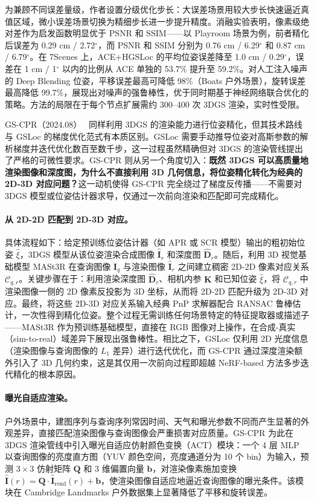 为兼顾不同误差量级，作者设置分级优化步长：大误差场景用较大步长快速逼近真值区域，微小误差场景切换为精细步长进一步提升精度。消融实验表明，像素级绝对差作为启发函数明显优于 PSNR 和 SSIM——以 Playroom 场景为例，前者精化后误差为 0.29 cm / 2.72$^\circ$，而 PSNR 和 SSIM 分别为 0.76 cm / 6.29$^\circ$ 和 0.87 cm / 6.79$^\circ$。在 7Scenes 上，ACE+HGSLoc 的平均位姿误差降至 1.0 cm / 0.29$^\circ$，误差在 1 cm / 1$^\circ$ 以内的比例从 ACE 单独的 53.7\% 提升至 59.2\%。对人工注入噪声的 Deep Blending 位姿，平移误差最高可降低 98\%（Boats 户外场景），旋转误差最高降低 99.7\%，展现出对噪声的强鲁棒性，优于同时期基于神经网络联合优化的策略。方法的局限在于每个节点扩展需约 300--400 次 3DGS 渲染，实时性受限。

GS-CPR（2024.08）~\cite{2408_11085} 同样利用 3DGS 的渲染能力进行位姿精化，但其技术路线与 GSLoc 的梯度优化范式有本质区别。GSLoc 需要手动推导位姿对高斯参数的解析梯度并迭代优化数百至数千步，这一过程虽然精确但对 3DGS 的渲染管线提出了严格的可微性要求。GS-CPR 则从另一个角度切入：\textbf{既然 3DGS 可以高质量地渲染图像和深度图，为什么不直接利用 3D 几何信息，将位姿精化转化为经典的 2D-3D 对应问题？}这一动机使得 GS-CPR 完全绕过了梯度反传播——不需要对 3DGS 模型或位姿估计器求导，仅通过一次前向渲染和匹配即可完成精化。

\paragraph{从 2D-2D 匹配到 2D-3D 对应。}
具体流程如下：给定预训练位姿估计器（如 APR 或 SCR 模型）输出的粗初始位姿 $\hat{\xi}$，3DGS 模型从该位姿渲染合成图像 $\hat{\mathbf{I}}_r$ 和深度图 $\hat{\mathbf{D}}_r$。随后，利用 3D 视觉基础模型 MASt3R 在查询图像 $\mathbf{I}_q$ 与渲染图像 $\hat{\mathbf{I}}_r$ 之间建立稠密 2D-2D 像素对应关系 $\mathcal{C}_{q,r}$。关键步骤在于：利用渲染深度图 $\hat{\mathbf{D}}_r$、相机内参 $\mathbf{K}$ 和已知位姿 $\hat{\xi}$，将 $\mathcal{C}_{q,r}$ 中渲染图像一侧的 2D 像素反投影为 3D 坐标，从而将 2D-2D 匹配升级为 2D-3D 对应。最终，将这些 2D-3D 对应关系输入经典 PnP 求解器配合 RANSAC 鲁棒估计，一次性得到精化位姿。整个过程无需训练任何场景特定的特征提取器或描述子——MASt3R 作为预训练基础模型，直接在 RGB 图像对上操作，在合成-真实（sim-to-real）域差异下展现出强鲁棒性。相比之下，GSLoc 仅利用 2D 光度信息（渲染图像与查询图像的 $L_1$ 差异）进行迭代优化，而 GS-CPR 通过深度渲染额外引入了 3D 几何约束，这是其仅用一次前向过程即超越 NeRF-based 方法多步迭代精化的根本原因。

\paragraph{曝光自适应渲染。}
户外场景中，建图序列与查询序列常因时间、天气和曝光参数不同而产生显著的外观差异，直接匹配渲染图像与查询图像会严重损害对应质量。GS-CPR 为此在 3DGS 渲染管线中引入曝光自适应仿射颜色变换（ACT）模块：一个 4 层 MLP 以查询图像的亮度直方图（YUV 颜色空间，亮度通道分为 10 个 bin）为输入，预测 $3 \times 3$ 仿射矩阵 $\mathbf{Q}$ 和 3 维偏置向量 $\mathbf{b}$，对渲染像素施加变换 $\hat{\mathbf{I}}(r) = \mathbf{Q} \cdot \hat{\mathbf{I}}_{\text{rend}}(r) + \mathbf{b}$，使渲染图像自适应地逼近查询图像的曝光条件。该模块在 Cambridge Landmarks 户外数据集上显著降低了平移和旋转误差。


